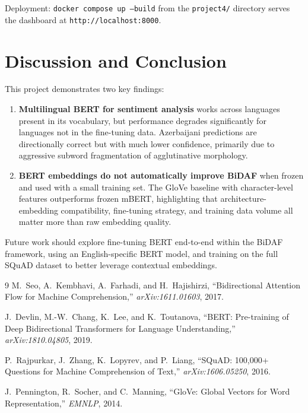 \documentclass[10pt,a4paper]{article}
\begin{document}
Deployment: \texttt{docker compose up --build} from the \texttt{project4/} directory serves the dashboard at \texttt{http://localhost:8000}.

\section{Discussion and Conclusion}

This project demonstrates two key findings:

\begin{enumerate}
    \item \textbf{Multilingual BERT for sentiment analysis} works across languages present in its vocabulary, but performance degrades significantly for languages not in the fine-tuning data. Azerbaijani predictions are directionally correct but with much lower confidence, primarily due to aggressive subword fragmentation of agglutinative morphology.
    \item \textbf{BERT embeddings do not automatically improve BiDAF} when frozen and used with a small training set. The GloVe baseline with character-level features outperforms frozen mBERT, highlighting that architecture-embedding compatibility, fine-tuning strategy, and training data volume all matter more than raw embedding quality.
\end{enumerate}

Future work should explore fine-tuning BERT end-to-end within the BiDAF framework, using an English-specific BERT model, and training on the full SQuAD dataset to better leverage contextual embeddings.

\begin{thebibliography}{9}
M.~Seo, A.~Kembhavi, A.~Farhadi, and H.~Hajishirzi,
``Bidirectional Attention Flow for Machine Comprehension,''
\textit{arXiv:1611.01603}, 2017.

J.~Devlin, M.-W.~Chang, K.~Lee, and K.~Toutanova,
``BERT: Pre-training of Deep Bidirectional Transformers for Language Understanding,''
\textit{arXiv:1810.04805}, 2019.

P.~Rajpurkar, J.~Zhang, K.~Lopyrev, and P.~Liang,
``SQuAD: 100,000+ Questions for Machine Comprehension of Text,''
\textit{arXiv:1606.05250}, 2016.

J.~Pennington, R.~Socher, and C.~Manning,
``GloVe: Global Vectors for Word Representation,''
\textit{EMNLP}, 2014.
\end{thebibliography}
\end{document}
